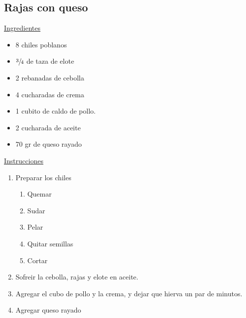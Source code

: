 \subsection{Rajas con queso}

\underline{Ingredientes}
\begin{itemize}
\item 8 chiles poblanos
\item $\sfrac{3}{4}$ de taza de elote
\item 2 rebanadas de cebolla
\item 4 cucharadas de crema
\item 1 cubito de caldo de pollo.
\item 2 cucharada de aceite
\item 70 gr de queso rayado
\end{itemize}

\underline{Instrucciones}
\begin{enumerate}
\item Preparar los chiles
\begin{enumerate}
\item Quemar
\item Sudar
\item Pelar
\item Quitar semillas
\item Cortar
\end{enumerate}
\item Sofreir la cebolla, rajas y elote en aceite.
\item Agregar el cubo de pollo y la crema, y dejar que hierva un par de minutos.
\item Agregar queso rayado
\end{enumerate}
